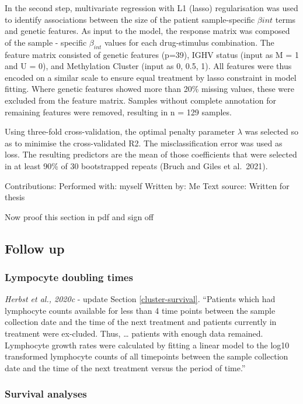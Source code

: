 \documentclass[11pt, a4paper, twosided]{book}
\begin{document}
In the second step, multivariate regression with L1 (lasso) regularisation was used to identify associations between the size of the patient sample-specific \(\beta{int}\) terms and genetic features. As input to the model, the response matrix was composed of the sample - specific \(\beta_{int}\) values for each drug-stimulus combination. The feature matrix consisted of genetic features (p=39), IGHV status (input as M = 1 and U = 0), and Methylation Cluster (input as 0, 0.5, 1). All features were thus encoded on a similar scale to ensure equal treatment by lasso constraint in model fitting. Where genetic features showed more than 20\% missing values, these were excluded from the feature matrix. Samples without complete annotation for remaining features were removed, resulting in n = 129 samples.

Using three-fold cross-validation, the optimal penalty parameter \(\lambda\) was selected so as to minimise the cross-validated R2. The misclassification error was used as loss. The resulting predictors are the mean of those coefficients that were selected in at least 90\% of 30 bootstrapped repeats (Bruch and Giles et al.~2021).

Contributions:
Performed with: myself
Written by: Me
Text source: Written for thesis

Now proof this section in pdf and sign off

\hypertarget{follow-up}{%
\subsection{Follow up}\label{follow-up}}

\hypertarget{LDT-method}{%
\subsubsection{Lympocyte doubling times}\label{LDT-method}}

\emph{Herbst et al., 2020c} - update
Section \ref{cluster-survival}. ``Patients which had lymphocyte counts available for less than 4 time points between the sample
collection date and the time of the next treatment and patients currently in treatment were ex-cluded. Thus, \ldots{} patients with enough data remained. Lymphocyte growth rates were calculated by fitting a linear model to the log10 transformed lymphocyte counts of all timepoints between the sample collection date and the time of the next treatment versus the period of time.''

\hypertarget{survival-method}{%
\subsubsection{Survival analyses}\label{survival-method}}
\end{document}
